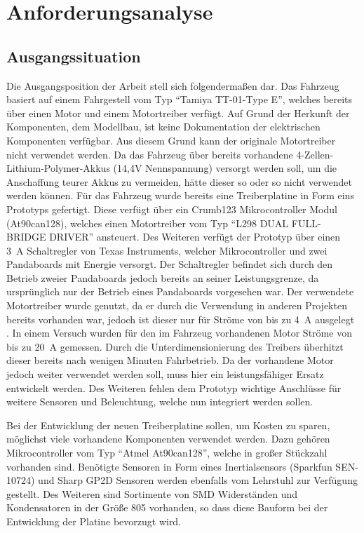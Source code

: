 
\chapter{Anforderungsanalyse}

\section{Ausgangssituation}
Die Ausgangsposition der Arbeit stell sich folgendermaßen dar. Das Fahrzeug basiert auf einem Fahrgestell vom Typ ``Tamiya TT-01-Type E'', welches bereits über einen Motor und einem Motortreiber verfügt.
Auf Grund der Herkunft der Komponenten, dem Modellbau, ist keine
Dokumentation der elektrischen Komponenten verfügbar.
Aus diesem Grund kann der originale Motortreiber nicht verwendet werden.
Da das Fahrzeug über bereits vorhandene 4-Zellen-Lithium-Polymer-Akkus (14,4V Nennspannung) versorgt werden soll, um die Anschaffung teurer Akkus zu vermeiden,
hätte dieser so oder so nicht verwendet werden können. 
Für das Fahrzeug wurde bereits eine Treiberplatine in Form eins Prototyps gefertigt.
Diese verfügt über ein Crumb123 Mikrocontroller Modul (At90can128), welches einen Motortreiber vom Typ ``L298 DUAL FULL-BRIDGE DRIVER'' ansteuert.
Des Weiteren verfügt der Prototyp über einen \SI{3}{\A} Schaltregler von Texas Instruments, welcher Mikrocontroller und zwei Pandaboards mit Energie versorgt. 
Der Schaltregler befindet sich durch den Betrieb zweier Pandaboards jedoch bereits an seiner Leistungsgrenze, da ursprünglich nur der Betrieb eines Pandaboards
vorgesehen war. Der verwendete Motortreiber wurde genutzt, da er durch die Verwendung in anderen Projekten bereits vorhanden war, jedoch ist dieser 
nur für Ströme von bis zu \SI{4}{\A} ausgelegt \cite{L298}. In einem Versuch wurden für den im Fahrzeug vorhandenen Motor Ströme von bis zu \SI{20}{\A} gemessen. 
Durch die Unterdimensionierung des Treibers überhitzt dieser bereits nach wenigen Minuten Fahrbetrieb.
Da der vorhandene Motor jedoch weiter verwendet werden soll, muss hier ein leistungsfähiger Ersatz 
entwickelt werden. Des Weiteren fehlen dem Prototyp wichtige Anschlüsse für weitere Sensoren und Beleuchtung, welche nun integriert werden sollen. 

Bei der Entwicklung der neuen Treiberplatine sollen, um Kosten zu sparen, möglichst viele vorhandene Komponenten verwendet werden. Dazu gehören
Mikrocontroller vom Typ ``Atmel At90can128'', welche in großer Stückzahl vorhanden sind. Benötigte Sensoren in Form eines Inertialsensors (Sparkfun SEN-10724)
und Sharp GP2D Sensoren werden ebenfalls vom Lehrstuhl zur Verfügung gestellt. Des Weiteren sind Sortimente von SMD Widerständen und
Kondensatoren in der Größe 805 vorhanden, so dass diese Bauform bei der Entwicklung der Platine bevorzugt wird.

